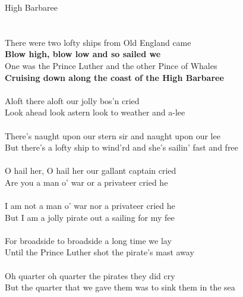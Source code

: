\documentclass[letterpaper,9pt]{article}
\begin{document}
\newpage
{}
\huge
High Barbaree\\
\\
\LARGE
\noindent
\\There were two lofty ships from Old England came
\\\textbf{Blow high, blow low and so sailed we}
\\One was the Prince Luther and the other Pince of Whales
\\\textbf{Cruising down along the coast of the High Barbaree}
\\
\\Aloft there aloft our jolly bos’n cried
\\Look ahead look astern look to weather and a-lee
\\
\\There’s naught upon our stern sir and naught upon our lee
\\But there’s a lofty ship to wind’rd and she’s sailin’ fast and free
\\
\\O hail her, O hail her our gallant captain cried
\\Are you a man o’ war or a privateer cried he
\\
\\I am not a man o’ war nor a privateer cried he
\\But I am a jolly pirate out a sailing for my fee
\\
\\For broadside to broadside a long time we lay
\\Until the Prince Luther shot the pirate’s mast away
\\
\\Oh quarter oh quarter the pirates they did cry
\\But the quarter that we gave them was to sink them in the sea
\end{document}
